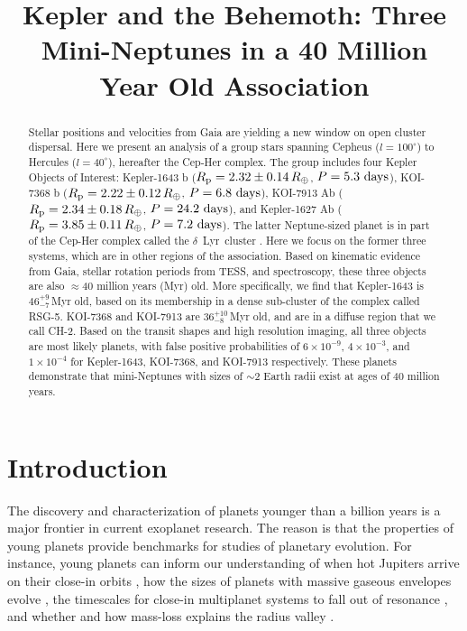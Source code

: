 \documentclass[12pt,twocolumn]{aastex63}
\begin{document}
\title{
  Kepler and the Behemoth: Three Mini-Neptunes in a 40 Million Year Old Association
}



\begin{abstract}
  Stellar positions and velocities from Gaia are yielding a new window
  on open cluster dispersal.  Here we present an analysis of a group
  stars spanning Cepheus ($l=100^\circ$) to Hercules ($l=40^\circ$),
  hereafter the Cep-Her complex.  The group includes four Kepler
  Objects of Interest:
  Kepler-1643 b ($R_{\rm p} = 2.32 \pm 0.14\,R_\oplus$, $P = 5.3\ {\rm days}$),
  KOI-7368 b ($R_{\rm p} = 2.22 \pm 0.12\,R_\oplus$, $P = 6.8\ {\rm days}$), 
  KOI-7913 Ab ($R_{\rm p} = 2.34 \pm 0.18\,R_\oplus$, $P = 24.2\ {\rm days}$), and
  Kepler-1627 Ab ($R_{\rm p} = 3.85 \pm 0.11\,R_\oplus$, $P = 7.2\ {\rm days}$).
  The latter Neptune-sized planet is in part of the Cep-Her complex
  called the $\delta$\ Lyr\ cluster \citep{bouma_kep1627_2022}.  Here
  we focus on the former three systems, which are in other regions of
  the association.  Based on kinematic evidence from Gaia, stellar
  rotation periods from TESS, and spectroscopy, these three objects
  are also $\approx$40 million years (Myr) old.  More specifically, we
  find that Kepler-1643 is $46^{+9}_{-7}$\,Myr old, based on its
  membership in a dense sub-cluster of the complex called RSG-5.
  KOI-7368 and KOI-7913 are $36^{+10}_{-8}$\,Myr old, and are in a
  diffuse region that we call CH-2.  Based on the transit shapes and
  high resolution imaging, all three objects are most likely planets,
  with false positive probabilities of $6\times10^{-9}$,
  $4\times10^{-3}$, and $1\times10^{-4}$ for Kepler-1643, KOI-7368,
  and KOI-7913 respectively.  These planets demonstrate
  that mini-Neptunes with sizes of $\sim$2 Earth radii exist at ages
  of 40 million years.
\end{abstract}



\section{Introduction}

The discovery and characterization of planets younger than a billion
years is a major frontier in current exoplanet research.  The reason
is that the properties of young planets provide benchmarks for studies
of planetary evolution.  For instance, young planets can inform our
understanding of when hot Jupiters arrive on their close-in orbits
\citep{dawson_johnson_2018}, how the sizes of planets with massive
gaseous envelopes evolve \citep{rizzuto_tess_2020}, the timescales for
close-in multiplanet systems to fall out of resonance
\citep{izidoro_breaking_2017,arevalo_stability_2022,goldberg_architectures_2022}, and
whether and how mass-loss explains the radius valley
\citep{lopez_how_2012,Owen_Wu_2013,Fulton_et_al_2017,ginzburg_corepowered_2018,lee_primordial_2021}.
\end{document}
